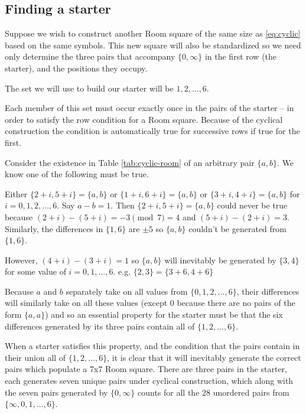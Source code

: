 \documentclass[11pt, a4paper]{book}\usepackage[]{graphicx}\usepackage[]{xcolor}
\begin{document}
\subsection{Finding a starter}

Suppose we wish to construct another Room square of the same
size as \eqref{eq:cyclic} based on the same
symbols. This new square will also be standardized so we
need only determine the three pairs that accompany
$\{0, \infty\}$ in the first row (the starter), and the
positions they occupy.

The set we will use to build our starter will be
${1, 2, \ldots, 6}$.

Each member of this set must occur exactly once in the pairs
of the starter – in order to satisfy the row condition for a
Room square.  Because of the cyclical construction the
condition is automatically true for successive rows if true
for the first.

Consider the existence in Table \ref{tab:cyclic-room} of an
arbitrary pair $\{a, b\}$. We know one of the following must be
true.

Either $\{2 + i, 5 + i\} = \{a, b\}$ or $\{1 + i, 6 + i\} = \{a, b\}$
or $\{3 + i, 4 + i\} = \{a, b\}$ for $i = 0, 1, 2, \ldots, 6$.
Say $a - b = 1$. Then $\{2 + i, 5 + i\} = \{a, b\}$ could never be
true because $(2 + i) - (5 + i) = -3\pmod 7 = 4$ and
$(5 + i) - (2 + i) = 3$. Similarly, the differences in $\{1, 6\}$
are $\pm 5$ so $\{a, b\}$ couldn’t be generated from $\{1, 6\}$.

However, $(4 + i) - (3 + i) = 1$ so $\{a, b\}$ will inevitably be
generated by $\{3, 4\}$ for some value of $i = 0, 1, \ldots, 6$.
e.g. $\{2, 3\} = \{3 + 6, 4 + 6\}$

Because $a$ and $b$ separately take on all values from
$\{0, 1, 2, \ldots, 6\}$, their differences will similarly take on
all these values (except 0 because there are no pairs of the form
$\{a, a\}$) and so an essential property for the starter must be
that the six differences generated by its three pairs contain all of
$\{1, 2, \ldots, 6\}$.

When a starter satisfies this property, and the condition
that the pairs contain in their union all of
$\{1, 2, \ldots, 6\}$, it is clear that it will inevitably generate
the correct pairs which populate a 7x7 Room square.  There
are three pairs in the starter, each generates seven unique
pairs under cyclical construction, which along with the
seven pairs generated by $\{0, \infty\}$ counts for all the
28 unordered pairs from $\{\infty, 0, 1, \ldots, 6\}$.
\end{document}
